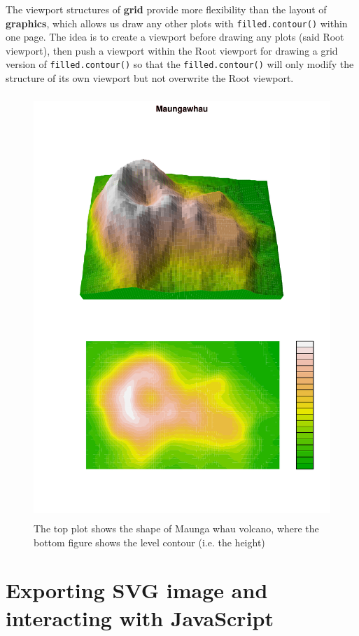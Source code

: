 \documentclass[11pt,twoside]{report}
\begin{document}
The viewport structures of \textbf{grid} provide more flexibility than the layout of \textbf{graphics}, which allows us draw any other plots with \texttt{filled.contour()} within one page. The idea is to create a viewport before drawing any plots (said Root viewport), then push a viewport within the Root viewport for drawing a grid version of \texttt{filled.contour()} so that the \texttt{filled.contour()} will only modify the structure of its own viewport but not overwrite the Root viewport.\\
\begin{figure}[H]
	\begin{center}
		\includegraphics[height = 16cm, width = 12cm]{figure/Chapter6_example_3_1.pdf}
		\caption{The top plot shows the shape of Maunga whau volcano, where the bottom figure shows the level contour (i.e. the height)}
		\label{Example_6.2.1}
	\end{center}
\end{figure}


\newpage
\section{Exporting SVG image and interacting with JavaScript}
\end{document}

